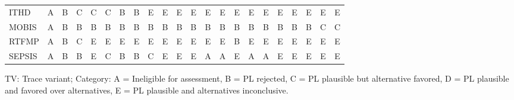{\begin{tabular}{lccccccccccccccccccccc}
ITHD & \cellcolor[HTML]{FFFFFF} A & \cellcolor[HTML]{EA4646} B & \cellcolor[HTML]{9670BD} C & \cellcolor[HTML]{9670BD} C & \cellcolor[HTML]{9670BD} C & \cellcolor[HTML]{EA4646} B & \cellcolor[HTML]{EA4646} B & \cellcolor[HTML]{19C8C8} E & \cellcolor[HTML]{19C8C8} E & \cellcolor[HTML]{19C8C8} E & \cellcolor[HTML]{19C8C8} E & \cellcolor[HTML]{19C8C8} E & \cellcolor[HTML]{19C8C8} E & \cellcolor[HTML]{19C8C8} E & \cellcolor[HTML]{19C8C8} E & \cellcolor[HTML]{19C8C8} E & \cellcolor[HTML]{19C8C8} E & \cellcolor[HTML]{19C8C8} E & \cellcolor[HTML]{19C8C8} E & \cellcolor[HTML]{19C8C8} E & \cellcolor[HTML]{19C8C8} E \\
MOBIS & \cellcolor[HTML]{FFFFFF} A & \cellcolor[HTML]{EA4646} B & \cellcolor[HTML]{EA4646} B & \cellcolor[HTML]{EA4646} B & \cellcolor[HTML]{EA4646} B & \cellcolor[HTML]{EA4646} B & \cellcolor[HTML]{EA4646} B & \cellcolor[HTML]{EA4646} B & \cellcolor[HTML]{EA4646} B & \cellcolor[HTML]{EA4646} B & \cellcolor[HTML]{EA4646} B & \cellcolor[HTML]{EA4646} B & \cellcolor[HTML]{EA4646} B & \cellcolor[HTML]{EA4646} B & \cellcolor[HTML]{EA4646} B & \cellcolor[HTML]{EA4646} B & \cellcolor[HTML]{EA4646} B & \cellcolor[HTML]{EA4646} B & \cellcolor[HTML]{EA4646} B & \cellcolor[HTML]{9670BD} C & \cellcolor[HTML]{9670BD} C \\
RTFMP & \cellcolor[HTML]{FFFFFF} A & \cellcolor[HTML]{EA4646} B & \cellcolor[HTML]{9670BD} C & \cellcolor[HTML]{19C8C8} E & \cellcolor[HTML]{19C8C8} E & \cellcolor[HTML]{19C8C8} E & \cellcolor[HTML]{19C8C8} E & \cellcolor[HTML]{19C8C8} E & \cellcolor[HTML]{19C8C8} E & \cellcolor[HTML]{19C8C8} E & \cellcolor[HTML]{19C8C8} E & \cellcolor[HTML]{19C8C8} E & \cellcolor[HTML]{19C8C8} E & \cellcolor[HTML]{EA4646} B & \cellcolor[HTML]{19C8C8} E & \cellcolor[HTML]{19C8C8} E & \cellcolor[HTML]{19C8C8} E & \cellcolor[HTML]{19C8C8} E & \cellcolor[HTML]{19C8C8} E & \cellcolor[HTML]{19C8C8} E & \cellcolor[HTML]{19C8C8} E \\
SEPSIS & \cellcolor[HTML]{FFFFFF} A & \cellcolor[HTML]{EA4646} B & \cellcolor[HTML]{EA4646} B & \cellcolor[HTML]{19C8C8} E & \cellcolor[HTML]{9670BD} C & \cellcolor[HTML]{EA4646} B & \cellcolor[HTML]{EA4646} B & \cellcolor[HTML]{9670BD} C & \cellcolor[HTML]{19C8C8} E & \cellcolor[HTML]{19C8C8} E & \cellcolor[HTML]{19C8C8} E & \cellcolor[HTML]{FFFFFF} A & \cellcolor[HTML]{FFFFFF} A & \cellcolor[HTML]{19C8C8} E & \cellcolor[HTML]{FFFFFF} A & \cellcolor[HTML]{FFFFFF} A & \cellcolor[HTML]{19C8C8} E & \cellcolor[HTML]{19C8C8} E & \cellcolor[HTML]{19C8C8} E & \cellcolor[HTML]{19C8C8} E & \cellcolor[HTML]{19C8C8} E \\
\bottomrule
\end{tabular}
}
\begin{center}\footnotesize
TV: Trace variant; \quad Category: A = Ineligible for assessment, B = PL rejected, C = PL plausible but alternative favored, D = PL plausible and favored over alternatives, E = PL plausible and alternatives inconclusive.
\end{center}
